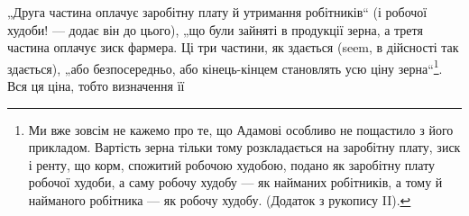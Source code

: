„Друга частина оплачує заробітну плату й утримання робітників“
(і робочої худоби! — додає він до цього), „що були зайняті в продукції
зерна, а третя частина оплачує зиск фармера. Ці три частини, як здається
(seem, в дійсності так здається), „або безпосередньо, або кінець-кінцем
становлять усю ціну зерна“\footnote{
Ми вже зовсім не кажемо про те, що Адамові особливо не пощастило з
його прикладом. Вартість зерна тільки тому розкладається на заробітну плату,
зиск і ренту, що корм, спожитий робочою худобою, подано як заробітну плату
робочої худоби, а саму робочу худобу — як найманих робітників, а тому й найманого
робітника — як робочу худобу. (Додаток з рукопису II).
}. Вся ця ціна, тобто визначення її
\parbreak{}  %
